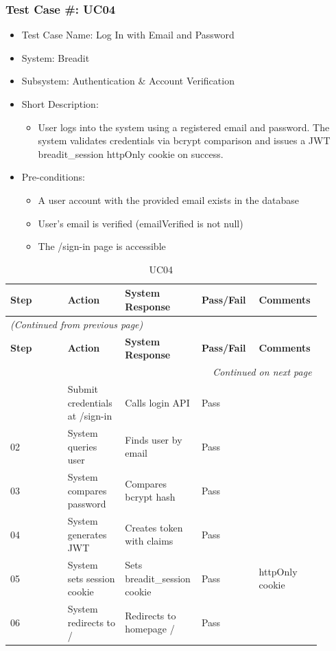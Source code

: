 \subsubsection{Test Case \#: UC04}
\begin{itemize}
  \item Test Case Name: Log In with Email and Password
  \item System: Breadit
  \item Subsystem: Authentication \& Account Verification
  \item Short Description:
\begin{itemize}
  \item User logs into the system using a registered email and password. The system validates credentials via bcrypt comparison and issues a JWT breadit\_session httpOnly cookie on success.
\end{itemize}
  \item Pre-conditions:
\begin{itemize}
  \item A user account with the provided email exists in the database
  \item User's email is verified (emailVerified is not null)
  \item The /sign-in page is accessible
\end{itemize}
\end{itemize}

\begin{longtable}{|p{0.18\linewidth}|p{0.18\linewidth}|p{0.18\linewidth}|p{0.18\linewidth}|p{0.18\linewidth}|}
\caption{UC04} \label{tab:28} \\
\hline
\textbf{Step} & \textbf{Action} & \textbf{System Response} & \textbf{Pass/Fail} & \textbf{Comments} \\
\hline
\endfirsthead
\multicolumn{5}{l}{\textit{(Continued from previous page)}} \\
\hline
\textbf{Step} & \textbf{Action} & \textbf{System Response} & \textbf{Pass/Fail} & \textbf{Comments} \\
\hline
\endhead
\hline \multicolumn{5}{r}{\textit{Continued on next page}} \\
\endfoot
\hline
\endlastfoot
01 & Submit credentials at /sign-in & Calls login API & Pass &  \\
\hline
02 & System queries user & Finds user by email & Pass &  \\
\hline
03 & System compares password & Compares bcrypt hash & Pass &  \\
\hline
04 & System generates JWT & Creates token with claims & Pass &  \\
\hline
05 & System sets session cookie & Sets breadit\_session cookie & Pass & httpOnly cookie \\
\hline
06 & System redirects to / & Redirects to homepage / & Pass &  \\
\hline
\end{longtable}


